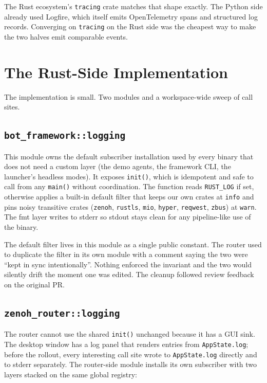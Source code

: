 \documentclass[11pt,a4paper]{article}
\begin{document}
The Rust ecosystem's \texttt{tracing} crate matches that shape
exactly. The Python side already used Logfire, which itself
emits OpenTelemetry spans and structured log records. Converging
on \texttt{tracing} on the Rust side was the cheapest way to
make the two halves emit comparable events.

\section{The Rust-Side Implementation}

The implementation is small. Two modules and a workspace-wide
sweep of call sites.

\subsection{\texttt{bot\_framework::logging}}

This module owns the default subscriber installation used by
every binary that does not need a custom layer (the demo agents,
the framework CLI, the launcher's headless modes). It exposes
\texttt{init()}, which is idempotent and safe to call from any
\texttt{main()} without coordination. The function reads
\texttt{RUST\_LOG} if set, otherwise applies a built-in default
filter that keeps our own crates at \texttt{info} and pins noisy
transitive crates (\texttt{zenoh}, \texttt{rustls},
\texttt{mio}, \texttt{hyper}, \texttt{reqwest}, \texttt{zbus})
at \texttt{warn}. The fmt layer writes to stderr so stdout stays
clean for any pipeline-like use of the binary.

The default filter lives in this module as a single public
constant. The router used to duplicate the filter in its own
module with a comment saying the two were ``kept in sync
intentionally''. Nothing enforced the invariant and the two
would silently drift the moment one was edited. The cleanup
followed review feedback on the original PR.

\subsection{\texttt{zenoh\_router::logging}}

The router cannot use the shared \texttt{init()} unchanged
because it has a GUI sink. The desktop window has a log panel
that renders entries from \texttt{AppState.log}; before the
rollout, every interesting call site wrote to
\texttt{AppState.log} directly and to stderr separately. The
router-side module installs its own subscriber with two layers
stacked on the same global registry:
\end{document}
